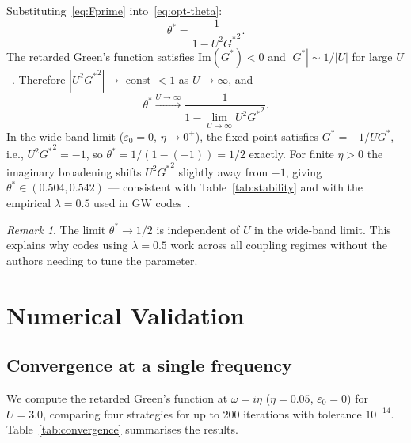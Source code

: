 \documentclass[aps,prb,twocolumn,superscriptaddress,nofootinbib,longbibliography,floatfix]{revtex4-2}
\newcommand{\optparam}{\theta^{*}}
\newcommand{\Gstar}{G^{*}}
\theoremstyle{plain}
\theoremstyle{remark}
\newtheorem{remark}[proposition]{Remark}
\begin{document}
Substituting~\eqref{eq:Fprime} into~\eqref{eq:opt-theta}:
%
\begin{equation}
  \optparam = \frac{1}{1 - U^2{\Gstar}^2}.
  \label{eq:thetastar-dyson}
\end{equation}
%
The retarded Green's function satisfies
$\text{Im}(\Gstar) < 0$ and $|\Gstar| \sim 1/|U|$ for large
$U$~\cite{Georges1996}.  Therefore $|U^2{\Gstar}^2| \to$ const
$< 1$ as $U \to \infty$, and
%
\begin{equation}
  \optparam \xrightarrow{U \to \infty}
  \frac{1}{1 - \lim_{U\to\infty} U^2 {\Gstar}^2}.
  \label{eq:limit}
\end{equation}
%
In the wide-band limit ($\varepsilon_0 = 0$, $\eta \to 0^+$),
the fixed point satisfies $\Gstar = -1/U\Gstar$, i.e.,
$U^2{\Gstar}^2 = -1$, so
$\optparam = 1/(1-(-1)) = 1/2$ exactly.
For finite $\eta > 0$ the imaginary broadening shifts
$U^2{\Gstar}^2$ slightly away from $-1$, giving
$\optparam \in (0.504, 0.542)$ — consistent with
Table~\ref{tab:stability} and with the empirical
$\lambda = 0.5$ used in GW codes~\cite{Chibani2016}.

\begin{remark}
The limit $\optparam \to 1/2$ is independent of $U$ in the
wide-band limit.  This explains why codes using
$\lambda = 0.5$ work across all coupling regimes without
the authors needing to tune the parameter.
\end{remark}

\section{Numerical Validation}
\label{sec:numerics}

\subsection{Convergence at a single frequency}
\label{ssec:single}

We compute the retarded Green's function at $\omega = i\eta$
($\eta = 0.05$, $\varepsilon_0 = 0$) for $U = 3.0$, comparing
four strategies for up to 200 iterations with tolerance
$10^{-14}$.  Table~\ref{tab:convergence} summarises the results.
\end{document}
